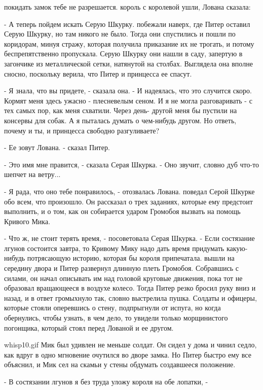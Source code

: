 покидать замок тебе не разрешается.
 король с королевой ушли, Лована сказала:
\par- А теперь пойдем искать Серую Шкурку.
 побежали наверх, где Питер оставил Серую Шкурку, но там никого 
не было. Тогда они спустились и пошли по коридорам, минуя стражу, 
которая получила приказание их не трогать, и потому беспрепятственно 
пропускала. Серую Шкурку они нашли в саду, запертую в загончике из 
металлической сетки, натянутой на столбах. Выглядела она вполне 
сносно, поскольку верила, что Питер и принцесса ее спасут.
\par- Я знала, что вы придете, - сказала она. - И надеялась, что это 
случится скоро. Кормят меня здесь ужасно - плесневелым сеном. И я не 
могла разговаривать - с тех самых пор, как меня схватили. Через день-
другой меня бы пустили на консервы для собак. А я пыталась думать о 
чем-нибудь другом. Но ответь, почему и ты, и принцесса свободно 
разгуливаете?
\par- Ее зовут Лована. - сказал Питер.
\par- Это имя мне правится, - сказала Серая Шкурка. - Оно звучит, 
словно дуб что-то шепчет на ветру...
\par- Я рада, что оно тебе понравилось, - отозвалась Лована.
 поведал Серой Шкурке обо всем, что произошло. Он рассказал о 
трех заданиях, которые ему предстоит выполнить, и о том, как он 
собирается ударом Громобоя вызвать на помощь Кривого Мика.
\par- Что ж, не стоит терять время, - посоветовала Серая Шкурка. - 
Если состязание лгунов состоится завтра, то Кривому Мику надо дать 
время придумать какую-нибудь потрясающую историю, которая бы короля 
припечатала.
 вышли на середину двора и Питер развернул длинную плеть 
Громобоя. Собравшись с силами, он начал описывать им над головой 
круговые движения, пока тот не образовал вращающееся в воздухе колесо. 
Тогда Питер резко бросил руку вниз и назад, и в ответ громыхнуло так, 
словно выстрелила пушка. Солдаты и офицеры, которые стояли оперевшись 
о стену, подпрыгнули от испуга, но когда обернулись, чтобы узнать, в 
чем дело, то увидели только морщинистого погонщика, который стоял 
перед Лованой и ее другом.
\par{whisp10.gif}
 Мик был удивлен не меньше солдат. Он сидел у дома и чинил 
седло, как вдруг в одно мгновение очутился во дворе замка. Но Питер 
быстро ему все объяснил, и Мик сел на скамьи у стены обдумать 
создавшееся положение.
\par- В состязании лгунов я без труда уложу короля на обе лопатки, - 
